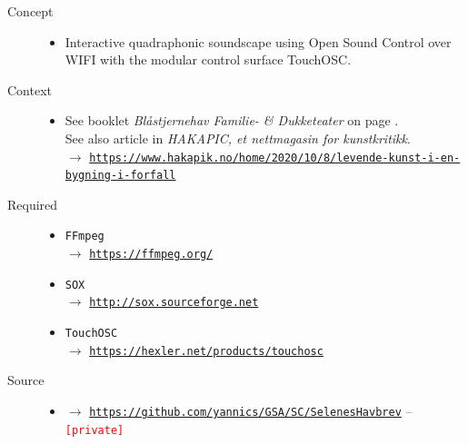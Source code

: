 \begin{description}
\item[Concept] \hfill 
\begin{itemize}
\item[] Interactive quadraphonic soundscape using Open Sound Control over WIFI with the modular control surface TouchOSC.
\end{itemize}

\item[Context] \hfill 
\begin{itemize}
\item[] 
See booklet \textsl{Bl\aa stjernehav Familie- \& Dukketeater} on page \pageref{psh}.\\
See also article in \textsl{HAKAPIC, et nettmagasin for kunstkritikk}.\\
$\rightarrow$ \href{https://www.hakapik.no/home/2020/10/8/levende-kunst-i-en-bygning-i-forfall}{\texttt{\scriptsize https://www.hakapik.no/home/2020/10/8/levende-kunst-i-en-bygning-i-forfall}}

\end{itemize}

\item[Required] \hfill 
\begin{itemize}
\setlength\itemsep{1em}
\item[] \texttt{FFmpeg} \\ $\rightarrow$ \href{https://ffmpeg.org/}{\texttt{\small https://ffmpeg.org/}}
\item[] \texttt{SOX} \\ $\rightarrow$ \href{http://sox.sourceforge.net/}{\texttt{\small http://sox.sourceforge.net}}
\item[] \texttt{TouchOSC} \\ $\rightarrow$ \href{https://hexler.net/products/touchosc}{\texttt{\small https://hexler.net/products/touchosc}}
\end{itemize}

\item[Source] \hfill 
\begin{itemize}
\item[] $\rightarrow$ \href{https://github.com/yannics/GSA/SC/SelenesHavbrev}{\texttt{\small https://github.com/yannics/GSA/SC/SelenesHavbrev}}  -- \texttt{\textcolor{red}{\small[private]}}
\end{itemize}


\end{description}
